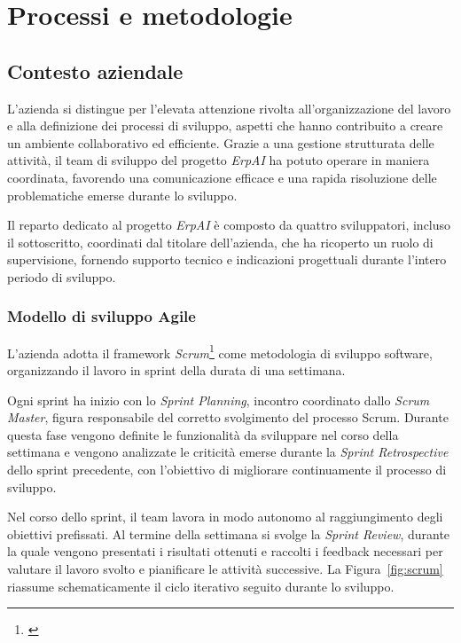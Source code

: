 \chapter{Processi e metodologie}
\label{chap:processi-metodologie}

\section{Contesto aziendale}

L'azienda si distingue per l'elevata attenzione rivolta all'organizzazione del lavoro e alla definizione dei processi di sviluppo, aspetti che hanno 
contribuito a creare un ambiente collaborativo ed efficiente. Grazie a una gestione strutturata delle attività, il team di sviluppo del progetto \textit{ErpAI} ha 
potuto operare in maniera coordinata, favorendo una comunicazione efficace e una rapida risoluzione delle problematiche emerse durante lo sviluppo.

Il reparto dedicato al progetto \textit{ErpAI} è composto da quattro sviluppatori, incluso il sottoscritto, coordinati dal titolare dell'azienda, che ha ricoperto 
un ruolo di supervisione, fornendo supporto tecnico e indicazioni progettuali durante l'intero periodo di sviluppo.

\subsection{Modello di sviluppo Agile}

L'azienda adotta il framework \textit{Scrum}\footnote{\cite{site:agile-manifesto}} come metodologia di sviluppo software, organizzando il lavoro in 
sprint della durata di una settimana.

Ogni sprint ha inizio con lo \textit{Sprint Planning}, incontro coordinato dallo \textit{Scrum Master}, figura responsabile del corretto svolgimento 
del processo Scrum. Durante questa fase vengono definite le funzionalità da sviluppare nel corso della settimana e vengono analizzate le criticità emerse 
durante la \textit{Sprint Retrospective} dello sprint precedente, con l'obiettivo di migliorare continuamente il processo di sviluppo.

Nel corso dello sprint, il team lavora in modo autonomo al raggiungimento degli obiettivi prefissati. Al termine della settimana si svolge la 
\textit{Sprint Review}, durante la quale vengono presentati i risultati ottenuti e raccolti i feedback necessari per valutare il lavoro svolto e pianificare 
le attività successive. La Figura~\ref{fig:scrum} riassume schematicamente il ciclo iterativo seguito durante lo sviluppo.

